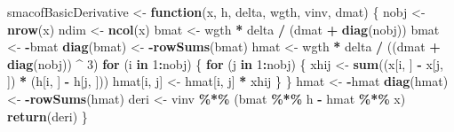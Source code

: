 \documentclass[
  12pt,
]{article}
\newenvironment{Shaded}{\begin{snugshade}}{\end{snugshade}}
\newcommand{\ControlFlowTok}[1]{\textcolor[rgb]{0.13,0.29,0.53}{\textbf{#1}}}
\newcommand{\DecValTok}[1]{\textcolor[rgb]{0.00,0.00,0.81}{#1}}
\newcommand{\FunctionTok}[1]{\textcolor[rgb]{0.13,0.29,0.53}{\textbf{#1}}}
\newcommand{\NormalTok}[1]{#1}
\newcommand{\OtherTok}[1]{\textcolor[rgb]{0.56,0.35,0.01}{#1}}
\newcommand{\SpecialCharTok}[1]{\textcolor[rgb]{0.81,0.36,0.00}{\textbf{#1}}}
\begin{document}
\begin{Shaded}
\begin{Highlighting}[]
\NormalTok{smacofBasicDerivative }\OtherTok{\textless{}{-}} \ControlFlowTok{function}\NormalTok{(x, h, delta, wgth, vinv, dmat) \{}
\NormalTok{  nobj }\OtherTok{\textless{}{-}} \FunctionTok{nrow}\NormalTok{(x)}
\NormalTok{  ndim }\OtherTok{\textless{}{-}} \FunctionTok{ncol}\NormalTok{(x)}
\NormalTok{  bmat }\OtherTok{\textless{}{-}}\NormalTok{ wgth }\SpecialCharTok{*}\NormalTok{ delta }\SpecialCharTok{/}\NormalTok{ (dmat }\SpecialCharTok{+} \FunctionTok{diag}\NormalTok{(nobj))}
\NormalTok{  bmat }\OtherTok{\textless{}{-}} \SpecialCharTok{{-}}\NormalTok{bmat}
  \FunctionTok{diag}\NormalTok{(bmat) }\OtherTok{\textless{}{-}} \SpecialCharTok{{-}}\FunctionTok{rowSums}\NormalTok{(bmat)}
\NormalTok{  hmat }\OtherTok{\textless{}{-}}\NormalTok{ wgth }\SpecialCharTok{*}\NormalTok{ delta }\SpecialCharTok{/}\NormalTok{ ((dmat }\SpecialCharTok{+} \FunctionTok{diag}\NormalTok{(nobj)) }\SpecialCharTok{\^{}} \DecValTok{3}\NormalTok{)}
  \ControlFlowTok{for}\NormalTok{ (i }\ControlFlowTok{in} \DecValTok{1}\SpecialCharTok{:}\NormalTok{nobj) \{}
    \ControlFlowTok{for}\NormalTok{ (j }\ControlFlowTok{in} \DecValTok{1}\SpecialCharTok{:}\NormalTok{nobj) \{}
\NormalTok{      xhij }\OtherTok{\textless{}{-}} \FunctionTok{sum}\NormalTok{((x[i, ] }\SpecialCharTok{{-}}\NormalTok{ x[j, ]) }\SpecialCharTok{*}\NormalTok{ (h[i, ] }\SpecialCharTok{{-}}\NormalTok{ h[j, ]))}
\NormalTok{      hmat[i, j] }\OtherTok{\textless{}{-}}\NormalTok{ hmat[i, j] }\SpecialCharTok{*}\NormalTok{ xhij}
\NormalTok{    \}}
\NormalTok{  \}}
\NormalTok{  hmat }\OtherTok{\textless{}{-}} \SpecialCharTok{{-}}\NormalTok{hmat}
  \FunctionTok{diag}\NormalTok{(hmat) }\OtherTok{\textless{}{-}} \SpecialCharTok{{-}}\FunctionTok{rowSums}\NormalTok{(hmat)}
\NormalTok{  deri }\OtherTok{\textless{}{-}}\NormalTok{ vinv }\SpecialCharTok{\%*\%}\NormalTok{ (bmat }\SpecialCharTok{\%*\%}\NormalTok{ h }\SpecialCharTok{{-}}\NormalTok{ hmat }\SpecialCharTok{\%*\%}\NormalTok{ x)}
  \FunctionTok{return}\NormalTok{(deri)}
\NormalTok{\}}


\end{Highlighting}
\end{Shaded}
\end{document}
